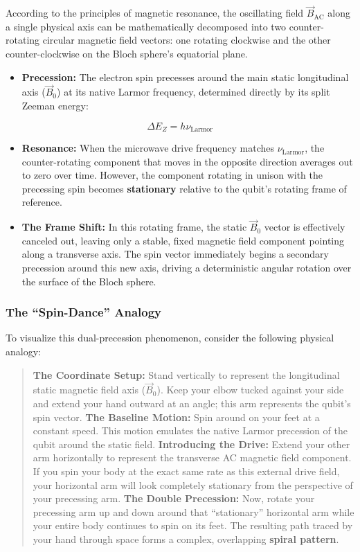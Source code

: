 \documentclass[
]{article}
\providecommand{\tightlist}{%
  \setlength{\itemsep}{0pt}\setlength{\parskip}{0pt}}
\begin{document}
According to the principles of magnetic resonance, the oscillating field
\(\vec{B}_{\text{AC}}\) along a single physical axis can be
mathematically decomposed into two counter-rotating circular magnetic
field vectors: one rotating clockwise and the other counter-clockwise on
the Bloch sphere's equatorial plane.

\begin{itemize}
\tightlist
\item
  \textbf{Precession:} The electron spin precesses around the main
  static longitudinal axis (\(\vec{B}_0\)) at its native Larmor
  frequency, determined directly by its split Zeeman energy:
\end{itemize}

\[\Delta E_Z = h \nu_{\text{Larmor}}\]

\begin{itemize}
\tightlist
\item
  \textbf{Resonance:} When the microwave drive frequency matches
  \(\nu_{\text{Larmor}}\), the counter-rotating component that moves in
  the opposite direction averages out to zero over time. However, the
  component rotating in unison with the precessing spin becomes
  \textbf{stationary} relative to the qubit's rotating frame of
  reference.
\item
  \textbf{The Frame Shift:} In this rotating frame, the static
  \(\vec{B}_0\) vector is effectively canceled out, leaving only a
  stable, fixed magnetic field component pointing along a transverse
  axis. The spin vector immediately begins a secondary precession around
  this new axis, driving a deterministic angular rotation over the
  surface of the Bloch sphere.
\end{itemize}

\subsubsection{The ``Spin-Dance'' Analogy}\label{the-spin-dance-analogy}

To visualize this dual-precession phenomenon, consider the following
physical analogy:

\begin{quote}
\textbf{The Coordinate Setup:} Stand vertically to represent the
longitudinal static magnetic field axis (\(\vec{B}_0\)). Keep your elbow
tucked against your side and extend your hand outward at an angle; this
arm represents the qubit's spin vector. \textbf{The Baseline Motion:}
Spin around on your feet at a constant speed. This motion emulates the
native Larmor precession of the qubit around the static field.
\textbf{Introducing the Drive:} Extend your other arm horizontally to
represent the transverse AC magnetic field component. If you spin your
body at the exact same rate as this external drive field, your
horizontal arm will look completely stationary from the perspective of
your precessing arm. \textbf{The Double Precession:} Now, rotate your
precessing arm up and down around that ``stationary'' horizontal arm
while your entire body continues to spin on its feet. The resulting path
traced by your hand through space forms a complex, overlapping
\textbf{spiral pattern}.
\end{quote}
\end{document}
